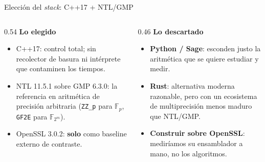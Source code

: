 \documentclass[aspectratio=169,11pt]{beamer}
\begin{document}
\begin{frame}{Elección del \emph{stack}: C++17 + NTL/GMP}
  \small
  \begin{columns}[t]
    \begin{column}{0.54\textwidth}
      \textbf{Lo elegido}
      \begin{itemize}\footnotesize
        \setlength{\itemsep}{2pt}
        \item \alert{C++17}: control total; sin recolector de basura
              ni intérprete que contaminen los tiempos.
        \item \alert{NTL 11.5.1 sobre GMP 6.3.0}: la referencia en aritmética de precisión
              arbitraria (\texttt{ZZ\_p} para $\mathbb{F}_p$, \texttt{GF2E} para
              $\mathbb{F}_{2^m}$).
        \item OpenSSL 3.0.2: \textbf{solo} como baseline externo de contraste.
      \end{itemize}
    \end{column}
    \begin{column}{0.46\textwidth}
      \textbf{Lo descartado}
      \begin{itemize}\footnotesize
        \setlength{\itemsep}{2pt}
        \item \textbf{Python / Sage}: esconden justo la aritmética que se quiere estudiar
              y medir.
        \item \textbf{Rust}: alternativa moderna razonable, pero con un ecosistema de
              multiprecisión menos maduro que NTL/GMP.
        \item \textbf{Construir sobre OpenSSL}: mediríamos su ensamblador a mano, no los
              algoritmos.
      \end{itemize}
    \end{column}
  \end{columns}
\end{frame}
\end{document}
